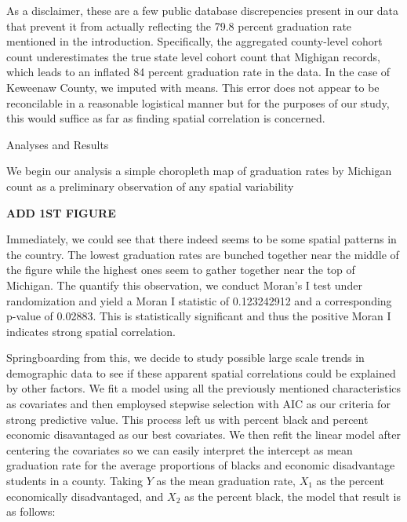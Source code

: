\documentclass[12pt,letterpaper]{article}
\begin{document}
\begin{flushleft}
\quad As a disclaimer, these are a few public database discrepencies present in our data that prevent it from actually reflecting the 79.8 percent graduation rate mentioned in the introduction. Specifically, the aggregated county-level cohort count underestimates the true state level cohort count that Mighigan records, which leads to an inflated 84 percent graduation rate in the data. In the case of Keweenaw County, we imputed with means. This error does not appear to be reconcilable in a reasonable logistical manner but for the purposes of our study, this would suffice as far as finding spatial correlation is concerned. 

\end{flushleft}

\begin{flushleft}
\LARGE{Analyses and Results}
\end{flushleft}
\quad We begin our analysis a simple choropleth map of graduation rates by Michigan count as a preliminary observation of any spatial variability

\begin{center}
\LARGE\textbf{ADD 1ST FIGURE}
\end{center}

\quad Immediately, we could see that there indeed seems to be some spatial patterns in the country. The lowest graduation rates are bunched together near the middle of the figure while the highest ones seem to gather together near the top of Michigan. The quantify this observation, we conduct Moran's I test under randomization and yield a Moran I statistic of 0.123242912 and a corresponding p-value of 0.02883. This is statistically significant and thus the positive Moran I indicates strong spatial correlation. 

\quad Springboarding from this, we decide to study possible large scale trends in demographic data to see if these apparent spatial correlations could be explained by other factors. We fit a model using all the previously mentioned characteristics as covariates and then employsed stepwise selection with AIC as our criteria for strong predictive value. This process left us with percent black and percent economic disavantaged as our best covariates. We then refit the linear model after centering the covariates so we can easily interpret the intercept as mean graduation rate for the average proportions of blacks and economic disadvantage students in a county. Taking $Y$ as the mean graduation rate, $X_1$ as the percent economically disadvantaged, and $X_2$ as the percent black, the model that result is as follows: 
\end{document}
